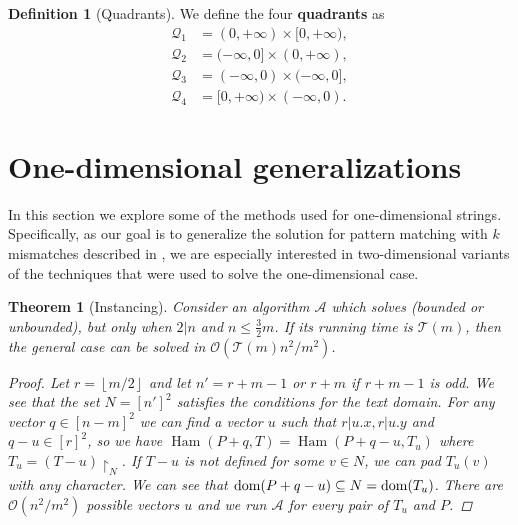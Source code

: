 \documentclass[11pt]{article}
\DeclareMathOperator*{\Ham}{Ham}
\renewcommand{\O}{\mathcal{O}}
\newcommand{\floor}[1]{\left\lfloor #1 \right\rfloor}
\newcommand{\eq}[1]{\begin{align*} #1 \end{align*}}
\theoremstyle{plain}
\newtheorem{theorem}{Theorem}
\theoremstyle{definition}
\newtheorem{definition}{Definition}
\theoremstyle{remark}
\newcommand{\restr}[2]{#1\restriction_{#2}}
\begin{document}
\newcommand{\Q}{\mathcal{Q}}
\begin{definition}[Quadrants]
	We define the four \textbf{quadrants} as
	\eq{
		\Q_1 &= (0, +\infty) \times [0, +\infty), \\
		\Q_2 &= (-\infty, 0] \times (0, +\infty), \\
		\Q_3 &= (-\infty, 0) \times (-\infty, 0], \\
		\Q_4 &= [0, +\infty) \times (-\infty, 0).
	}
\end{definition}


\section{One-dimensional generalizations}
In this section we explore some of the methods used for one-dimensional strings.
Specifically, as our goal is to generalize the solution for pattern matching with $k$ mismatches described in \cite{Gawrychowski2017}, we are especially interested in two-dimensional variants of the techniques that were used to solve the one-dimensional case.


\begin{theorem}[Instancing]\label{instancing}
	Consider an algorithm $\mathcal{A}$ which solves \HD (bounded or unbounded), but only when $2|n$ and $n \le \frac{3}{2}m$.
	If its running time is $\mathcal{T}(m)$, then the general case can be solved in $\O(\mathcal{T}(m) n^2 / m^2)$.
	\begin{proof}
		Let $r = \floor{m / 2}$ and let $n' = r + m - 1$ or $r + m$ if $r + m - 1$ is odd.
		We see that the set $N = [n']^2$ satisfies the conditions for the text domain.
		For any vector $q \in [n - m]^2$ we can find a vector $u$ such that $r|u.x, r|u.y$ and $q - u \in [r]^2$,
		so we have $\Ham(P + q, T) = \Ham(P + q - u, T_u)$ where $T_u = \restr{(T - u)}{N}$.
		If $T - u$ is not defined for some $v \in N$, we can pad $T_u(v)$ with any character.
		We can see that $\operatorname*{dom}(P + q - u) \subseteq N = \operatorname*{dom}(T_u)$.
		There are $\O(n^2 / m^2)$ possible vectors $u$ and we run $\mathcal{A}$ for every pair of $T_u$ and $P$.
	\end{proof}
\end{theorem}
\end{document}

